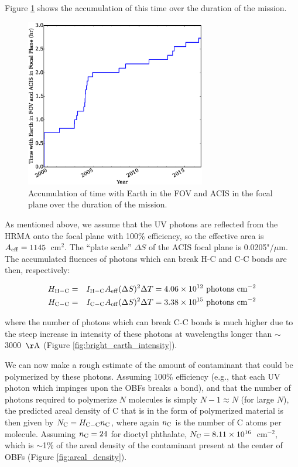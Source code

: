 \documentclass[11pt]{article}
\begin{document}
\noindent
Figure \ref{fig:time_accum} shows the accumulation of this time over the duration of the mission.

\begin{figure}
\begin{center}
\includegraphics[width=0.7\textwidth]{time_accum.eps}
\caption{Accumulation of time with Earth in the FOV and ACIS in the focal plane over the duration of the mission.\label{fig:time_accum}}
\end{center}
\end{figure}

As mentioned above, we assume that the UV photons are reflected from the HRMA onto the focal plane with 100\% efficiency,
so the effective area is $A_{\rm eff} = 1145$~cm$^2$. The ``plate scale'' $\Delta{S}$ of the ACIS focal plane is 0.0205"/$\mu$m.
The accumulated fluences of photons which can break H-C and C-C bonds are then, respectively:

\begin{eqnarray}
H_{\rm H-C} &=& I_{\rm H-C}A_{\rm eff}(\Delta{S})^2\Delta{T} = 4.06 \times 10^{12}~{\rm photons~cm^{-2}} \\
H_{\rm C-C} &=& I_{\rm C-C}A_{\rm eff}(\Delta{S})^2\Delta{T} = 3.38 \times 10^{15}~{\rm photons~cm^{-2}}\label{eqn:fluence}
\end{eqnarray}

\noindent
where the number of photons which can break C-C bonds is much higher due to the steep increase in intensity of these photons
at wavelengths longer than $\sim$3000~${\rm \AA}$ (Figure \ref{fig:bright_earth_intensity}).

We can now make a rough estimate of the amount of contaminant that could be polymerized by these photons. Assuming 100\%
efficiency (e.g., that each UV photon which impinges upon the OBFs breaks a bond), and that the number of photons required
to polymerize $N$ molecules is simply $N-1 \approx N$ (for large $N$), the predicted areal density of C that is in the form of
polymerized material is then given by $N_{\rm C} = H_{\rm C-C}n_{\rm C}$, where again $n_{\rm C}$ is the number of C atoms per
molecule. Assuming $n_{\rm C} = 24$ for dioctyl phthalate, $N_{\rm C} = 8.11 \times 10^{16}$~cm$^{-2}$, which is $\sim$1\%
of the areal density of the contaminant present at the center of OBFs (Figure \ref{fig:areal_density}).
\end{document}
